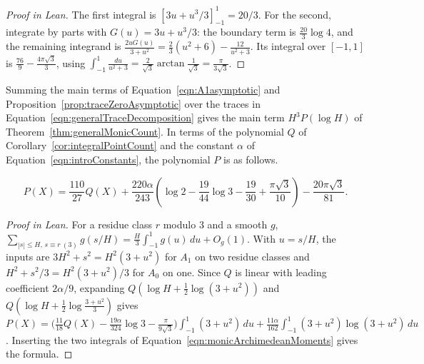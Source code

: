 \begin{proof}[Proof in Lean]

\leanok

The first integral is $[3u+u^3/3]_{-1}^1=20/3$. For the second, integrate by parts with $G(u)=3u+u^3/3$: the boundary term is $\frac{20}3\log4$, and the remaining integrand is $\frac{2uG(u)}{3+u^2}=\frac23(u^2+6)-\frac{12}{u^2+3}$. Its integral over $[-1,1]$ is $\frac{76}9-\frac{4\pi\sqrt3}{3}$, using $\int_{-1}^1\frac{du}{u^2+3}=\frac2{\sqrt3}\arctan\frac1{\sqrt3}=\frac{\pi}{3\sqrt3}$.

\end{proof}

\begin{equationnode}

\label{eqn:monicConstantsFromTraceCounts}


\leanok

Summing the main terms of Equation~\ref{eqn:A1asymptotic} and Proposition~\ref{prop:traceZeroAsymptotic} over the traces in Equation~\ref{eqn:generalTraceDecomposition} gives the main term $H^3P(\log H)$ of Theorem~\ref{thm:generalMonicCount}. In terms of the polynomial $Q$ of Corollary~\ref{cor:integralPointCount} and the constant $\alpha$ of Equation~\ref{eqn:introConstants}, the polynomial $P$ is as follows.

\begin{equation*} P(X) =\frac{110}{27}Q(X) +\frac{220\alpha}{243}\left(\log2-\frac{19}{44}\log3 -\frac{19}{30}+\frac{\pi\sqrt3}{10}\right) -\frac{20\pi\sqrt3}{81}. \end{equation*}

\end{equationnode}

\begin{proof}[Proof in Lean]

\leanok


For a residue class $r$ modulo $3$ and a smooth $g$, $\sum_{|s|\leq H,\,s\equiv r\ (3)}g(s/H)=\frac H3\int_{-1}^1g(u)\,du+O_g(1)$. With $u=s/H$, the inputs are $3H^2+s^2=H^2(3+u^2)$ for $A_1$ on two residue classes and $H^2+s^2/3=H^2(3+u^2)/3$ for $A_0$ on one. Since $Q$ is linear with leading coefficient $2\alpha/9$, expanding $Q(\log H+\frac12\log(3+u^2))$ and $Q(\log H+\frac12\log\frac{3+u^2}3)$ gives $P(X)=\bigl(\frac{11}{18}Q(X)-\frac{19\alpha}{324}\log3-\frac{\pi}{9\sqrt3}\bigr)\int_{-1}^1(3+u^2)\,du+\frac{11\alpha}{162}\int_{-1}^1(3+u^2)\log(3+u^2)\,du$. Inserting the two integrals of Equation~\ref{eqn:monicArchimedeanMoments} gives the formula.

\end{proof}

